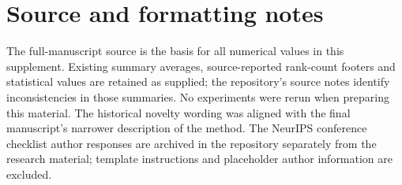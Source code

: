 \documentclass[10pt,a4paper]{article}
\begin{document}
\section*{Source and formatting notes}
The full-manuscript source is the basis for all numerical values in this supplement. Existing summary averages, source-reported rank-count footers and statistical values are retained as supplied; the repository's source notes identify inconsistencies in those summaries. No experiments were rerun when preparing this material. The historical novelty wording was aligned with the final manuscript's narrower description of the method. The NeurIPS conference checklist author responses are archived in the repository separately from the research material; template instructions and placeholder author information are excluded.
\clearpage
\end{document}
